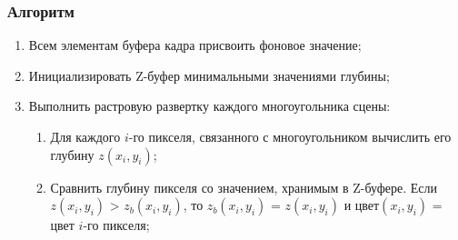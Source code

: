 \subsubsection*{Алгоритм}
\begin{enumerate}
	\item  Всем элементам буфера кадра присвоить фоновое значение;
	\item Инициализировать Z-буфер минимальными значениями глубины;
	\item Выполнить растровую развертку каждого многоугольника сцены:
	\begin{enumerate}
		\item   Для каждого $i$-го пикселя, связанного с многоугольником вычислить его
глубину \begin{math}
z(x_i, y_i)
\end{math};
		\item  Сравнить глубину пикселя со значением, хранимым в Z-буфере. Если
\begin{math}
z(x_i, y_i)
\end{math} > \begin{math}
z_b(x_i, y_i)
\end{math}, то \begin{math}
z_b(x_i, y_i)
\end{math} = \begin{math}
z(x_i, y_i)
\end{math} и цвет\begin{math}
(x_i, y_i)
\end{math} = цвет $i$-го пикселя;
	\end{enumerate}
\end{enumerate} 
